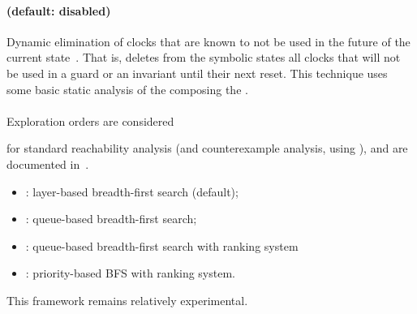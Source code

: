 \paragraph{ (default: disabled)}
Dynamic elimination of clocks that are known to not be used in the future of the current state~\cite{Andre13FSFMA}.
That is, \imitator{} deletes from the symbolic states all clocks that will not be used in a guard or an invariant until their next reset.
This technique uses some basic static analysis of the \IPTA{} composing the \NIPTA{}.


\paragraph{ } %
Exploration orders are considered %

for standard reachability analysis (and counterexample analysis, using ), and are documented in~\cite{ANP17}.
\begin{itemize}
	\item {}: layer-based breadth-first search (default);
	\item {}: queue-based breadth-first search;
	\item {}: queue-based breadth-first search with ranking system
	\item {}: priority-based BFS with ranking system.
\end{itemize}
%
This framework remains relatively experimental.




